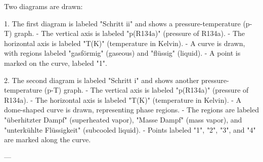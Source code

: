 Two diagrams are drawn:  

1. The first diagram is labeled "Schritt ii" and shows a pressure-temperature (p-T) graph.  
   - The vertical axis is labeled "p(R134a)" (pressure of R134a).  
   - The horizontal axis is labeled "T(K)" (temperature in Kelvin).  
   - A curve is drawn, with regions labeled "gasförmig" (gaseous) and "flüssig" (liquid).  
   - A point is marked on the curve, labeled "1".  

2. The second diagram is labeled "Schritt i" and shows another pressure-temperature (p-T) graph.  
   - The vertical axis is labeled "p(R134a)" (pressure of R134a).  
   - The horizontal axis is labeled "T(K)" (temperature in Kelvin).  
   - A dome-shaped curve is drawn, representing phase regions.  
   - The regions are labeled "überhitzter Dampf" (superheated vapor), "Masse Dampf" (mass vapor), and "unterkühlte Flüssigkeit" (subcooled liquid).  
   - Points labeled "1", "2", "3", and "4" are marked along the curve.  

---